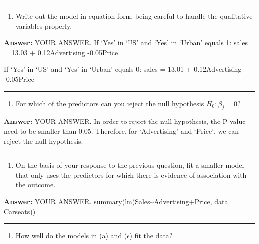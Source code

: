 \documentclass[
]{article}
\providecommand{\tightlist}{%
  \setlength{\itemsep}{0pt}\setlength{\parskip}{0pt}}
\begin{document}
\begin{center}\rule{0.5\linewidth}{\linethickness}\end{center}

\begin{enumerate}
\def\labelenumi{(\alph{enumi})}
\setcounter{enumi}{2}
\tightlist
\item
  Write out the model in equation form, being careful to handle the
  qualitative variables properly.
\end{enumerate}

\textbf{Answer:} YOUR ANSWER. If `Yes' in `US' and `Yes' in `Urban'
equals 1: sales = 13.03 + 0.12Advertising -0.05Price

If `Yes' in `US' and `Yes' in `Urban' equals 0: sales = 13.01 +
0.12Advertising -0.05Price

\begin{center}\rule{0.5\linewidth}{\linethickness}\end{center}

\begin{enumerate}
\def\labelenumi{(\alph{enumi})}
\setcounter{enumi}{3}
\tightlist
\item
  For which of the predictors can you reject the null hypothesis
  \(H_0 : \beta_j = 0\)?
\end{enumerate}

\textbf{Answer:} YOUR ANSWER. In order to reject the null hypothesis,
the P-value need to be smaller than 0.05. Therefore, for `Advertising'
and `Price', we can reject the null hypothesis.

\begin{center}\rule{0.5\linewidth}{\linethickness}\end{center}

\begin{enumerate}
\def\labelenumi{(\alph{enumi})}
\setcounter{enumi}{4}
\tightlist
\item
  On the basis of your response to the previous question, fit a smaller
  model that only uses the predictors for which there is evidence of
  association with the outcome.
\end{enumerate}

\textbf{Answer:} YOUR ANSWER.
summary(lm(Sales\textasciitilde Advertising+Price, data = Carseats))

\begin{center}\rule{0.5\linewidth}{\linethickness}\end{center}

\begin{enumerate}
\def\labelenumi{(\alph{enumi})}
\setcounter{enumi}{5}
\tightlist
\item
  How well do the models in (a) and (e) fit the data?
\end{enumerate}
\end{document}
